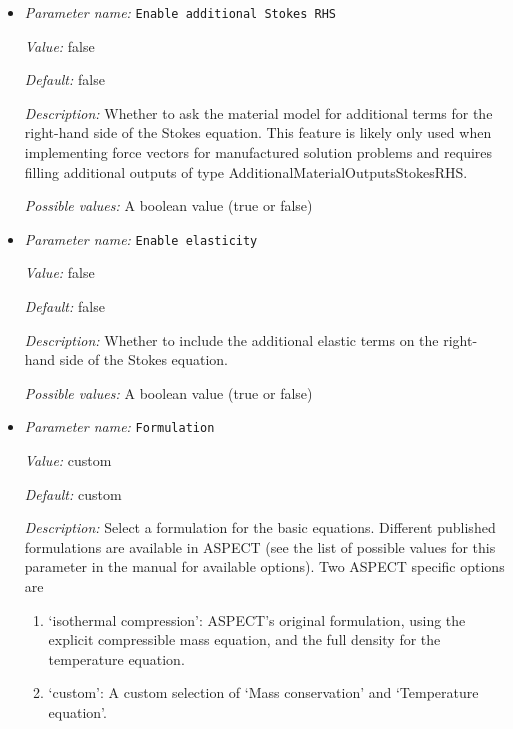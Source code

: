 \begin{itemize}
\item {\it Parameter name:} {\tt Enable additional Stokes RHS}
\label{parameters:Formulation/Enable additional Stokes RHS}
\label{parameters:Formulation/Enable_20additional_20Stokes_20RHS}


{\it Value:} false


{\it Default:} false


{\it Description:} Whether to ask the material model for additional terms for the right-hand side of the Stokes equation. This feature is likely only used when implementing force vectors for manufactured solution problems and requires filling additional outputs of type AdditionalMaterialOutputsStokesRHS.


{\it Possible values:} A boolean value (true or false)
\item {\it Parameter name:} {\tt Enable elasticity}
\label{parameters:Formulation/Enable elasticity}
\label{parameters:Formulation/Enable_20elasticity}


{\it Value:} false


{\it Default:} false


{\it Description:} Whether to include the additional elastic terms on the right-hand side of the Stokes equation.


{\it Possible values:} A boolean value (true or false)
\item {\it Parameter name:} {\tt Formulation}
\label{parameters:Formulation/Formulation}


{\it Value:} custom


{\it Default:} custom


{\it Description:} Select a formulation for the basic equations. Different published formulations are available in ASPECT (see the list of possible values for this parameter in the manual for available options). Two ASPECT specific options are
\begin{enumerate}
  \item `isothermal compression': ASPECT's original formulation, using the explicit compressible mass equation, and the full density for the temperature equation.
  \item `custom': A custom selection of `Mass conservation' and `Temperature equation'.
\end{enumerate}


\end{itemize}
